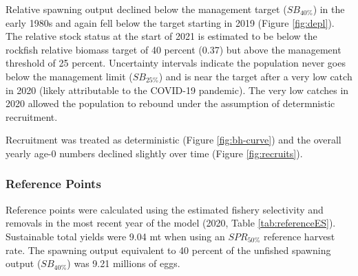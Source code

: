 \documentclass[11pt,
  english,
  a4paper,
]{article}
\begin{document}

Relative spawning output declined below the management target ({\(SB_{40\%}\)\leavevmode\tagmcend\tagstructend}) in the early 1980s and again fell below the target starting in 2019 (Figure \ref{fig:depl}). The relative stock status at the start of 2021 is estimated to be below the rockfish relative biomass target of 40 percent (0.37) but above the management threshold of 25 percent. Uncertainty intervals indicate the population never goes below the management limit ({\(SB_{25\%}\)\leavevmode\tagmcend\tagstructend}) and is near the target after a very low catch in 2020 (likely attributable to the COVID-19 pandemic). The very low catches in 2020 allowed the population to rebound under the assumption of determnistic recruitment.

\leavevmode\tagmcend\tagstructend\par


Recruitment was treated as deterministic (Figure \ref{fig:bh-curve}) and the overall yearly age-0 numbers declined slightly over time (Figure \ref{fig:recruits}).

\leavevmode\tagmcend\tagstructend\par


\hypertarget{reference-points}{%
\subsubsection{Reference Points}\label{reference-points}}

\leavevmode\tagmcend\tagstructend


Reference points were calculated using the estimated fishery selectivity and removals in the most recent year of the model (2020, Table \ref{tab:referenceES}). Sustainable total yields were 9.04 mt when using an {\(SPR_{50\%}\)\leavevmode\tagmcend\tagstructend} reference harvest rate. The spawning output equivalent to 40 percent of the unfished spawning output ({\(SB_{40\%}\)\leavevmode\tagmcend\tagstructend}) was 9.21 millions of eggs.
\end{document}

